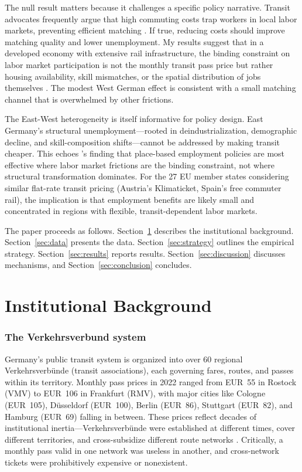 \documentclass[12pt]{article}
\begin{document}
The null result matters because it challenges a specific policy narrative. Transit advocates frequently argue that high commuting costs trap workers in local labor markets, preventing efficient matching \citep{marinescu2018mismatch, manning2017much}. If true, reducing costs should improve matching quality and lower unemployment. My results suggest that in a developed economy with extensive rail infrastructure, the binding constraint on labor market participation is not the monthly transit pass price but rather housing availability, skill mismatches, or the spatial distribution of jobs themselves \citep{kline2010place}. The modest West German effect is consistent with a small matching channel that is overwhelmed by other frictions.

The East-West heterogeneity is itself informative for policy design. East Germany's structural unemployment---rooted in deindustrialization, demographic decline, and skill-composition shifts---cannot be addressed by making transit cheaper. This echoes \citet{kline2010place}'s finding that place-based employment policies are most effective where labor market frictions are the binding constraint, not where structural transformation dominates. For the 27 EU member states considering similar flat-rate transit pricing (Austria's Klimaticket, Spain's free commuter rail), the implication is that employment benefits are likely small and concentrated in regions with flexible, transit-dependent labor markets.

The paper proceeds as follows. Section~\ref{sec:background} describes the institutional background. Section~\ref{sec:data} presents the data. Section~\ref{sec:strategy} outlines the empirical strategy. Section~\ref{sec:results} reports results. Section~\ref{sec:discussion} discusses mechanisms, and Section~\ref{sec:conclusion} concludes.

\section{Institutional Background}
\label{sec:background}

\subsubsection*{The Verkehrsverbund system}
Germany's public transit system is organized into over 60 regional Verkehrsverb\"unde (transit associations), each governing fares, routes, and passes within its territory. Monthly pass prices in 2022 ranged from EUR~55 in Rostock (VMV) to EUR~106 in Frankfurt (RMV), with major cities like Cologne (EUR~105), D\"usseldorf (EUR~100), Berlin (EUR~86), Stuttgart (EUR~82), and Hamburg (EUR~69) falling in between. These prices reflect decades of institutional inertia---Verkehrsverb\"unde were established at different times, cover different territories, and cross-subsidize different route networks \citep{buehler2017germany}. Critically, a monthly pass valid in one network was useless in another, and cross-network tickets were prohibitively expensive or nonexistent.
\end{document}
